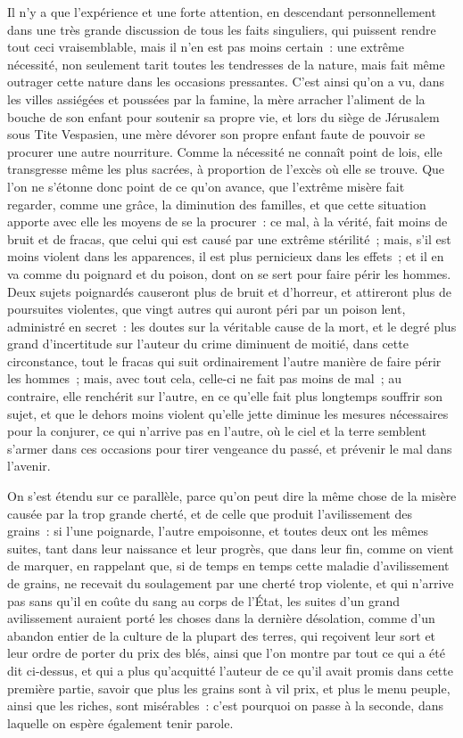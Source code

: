 \documentclass[french,twoside]{book} %
\begin{document}
Il n’y a que l’expérience et une forte attention, en descendant personnellement dans une très grande discussion de tous les faits singuliers, qui puissent rendre tout ceci vraisemblable, mais il n’en est pas moins certain : une extrême nécessité, non seulement tarit toutes les tendresses de la nature, mais fait même outrager cette nature dans les occasions pressantes. C’est ainsi qu’on a vu, dans les villes assiégées et poussées par la famine, la mère arracher l’aliment de la bouche de son enfant pour soutenir sa propre vie, et lors du siège de Jérusalem sous Tite Vespasien, une mère dévorer son propre enfant faute de pouvoir se procurer une autre nourriture. Comme la nécessité ne connaît point de lois, elle transgresse même les plus sacrées, à proportion de l’excès où elle se trouve. Que l’on ne s’étonne donc point de ce qu’on avance, que l’extrême misère fait regarder, comme une grâce, la diminution des familles, et que cette situation apporte avec elle les moyens de se la procurer : ce mal, à la vérité, fait moins de bruit et de fracas, que celui qui est causé par une extrême stérilité ; mais, s’il est moins violent dans les apparences, il est plus pernicieux dans les effets ; et il en va comme du poignard et du poison, dont on se sert pour faire périr les hommes. Deux sujets poignardés causeront plus de bruit et d’horreur, et attireront plus de poursuites violentes, que vingt autres qui auront péri par un poison lent, administré en secret : les doutes sur la véritable cause de la mort, et le degré plus grand d’incertitude sur l’auteur du crime diminuent de moitié, dans cette circonstance, tout le fracas qui suit ordinairement l’autre manière de faire périr les hommes ; mais, avec tout cela, celle-ci ne fait pas moins de mal ; au contraire, elle renchérit sur l’autre, en ce qu’elle fait plus longtemps souffrir son sujet, et que le dehors moins violent qu’elle jette diminue les mesures nécessaires pour la conjurer, ce qui n’arrive pas en l’autre, où le ciel et la terre semblent s’armer dans ces occasions pour tirer vengeance du passé, et prévenir le mal dans l’avenir.\par
On s’est étendu sur ce parallèle, parce qu’on peut dire la même chose de la misère causée par la trop grande cherté, et de celle que produit l’avilissement des grains : si l’une poignarde, l’autre empoisonne, et toutes deux ont les mêmes suites, tant dans leur naissance et leur progrès, que dans leur fin, comme on vient de marquer, en rappelant que, si de temps en temps cette maladie d’avilissement de grains, ne recevait du soulagement par une cherté trop violente, et qui n’arrive pas sans qu’il en coûte du sang au corps de l’État, les suites d’un grand avilissement auraient porté les choses dans la dernière désolation, comme d’un abandon entier de la culture de la plupart des terres, qui reçoivent leur sort et leur ordre de porter du prix des blés, ainsi que l’on montre par tout ce qui a été dit ci-dessus, et qui a plus qu’acquitté l’auteur de ce qu’il avait promis dans cette première partie, savoir que plus les grains sont à vil prix, et plus le menu peuple, ainsi que les riches, sont misérables : c’est pourquoi on passe à la seconde, dans laquelle on espère également tenir parole.
\end{document}
